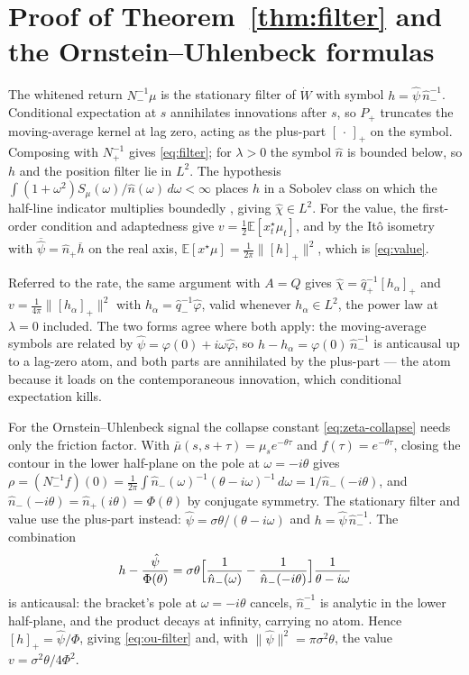 \documentclass[11pt]{article}
\newcommand{\E}{\mathbb{E}}
\newcommand{\pluspart}[1]{\left[#1\right]_+}
\theoremstyle{plain}
\theoremstyle{definition}
\theoremstyle{remark}
\begin{document}
\section{Proof of Theorem~\ref{thm:filter} and the Ornstein--Uhlenbeck formulas}\label{app:B}
The whitened return $N_-^{-1}\mu$ is the stationary filter of $\dot W$ with symbol $h=\hat\psi\,\hat n_-^{-1}$. Conditional expectation at $s$ annihilates innovations after $s$, so $P_+$ truncates the moving-average kernel at lag zero, acting as the plus-part $\pluspart{\,\cdot\,}$ on the symbol. Composing with $N_+^{-1}$ gives \eqref{eq:filter}; for $\lambda>0$ the symbol $\hat n$ is bounded below, so $h$ and the position filter lie in $L^2$. The hypothesis $\int(1+\omega^2)S_\mu(\omega)/\hat n(\omega)\,d\omega<\infty$ places $h$ in a Sobolev class on which the half-line indicator multiplies boundedly \citep[Ch.~1]{LionsMagenes1972}, giving $\hat\chi\in L^2$. For the value, the first-order condition and adaptedness give $v=\tfrac12\E[x^\star_t\mu_t]$, and by the It\^o isometry with $\overline{\hat\psi}=\hat n_+\overline h$ on the real axis, $\E[x^\star\mu]=\tfrac1{2\pi}\|\pluspart{h}\|^2$, which is \eqref{eq:value}.

Referred to the rate, the same argument with $A=Q$ gives $\hat\chi=\hat q_+^{-1}\pluspart{h_\alpha}$ and $v=\frac1{4\pi}\|\pluspart{h_\alpha}\|^2$ with $h_\alpha=\hat q_-^{-1}\hat\varphi$, valid whenever $h_\alpha\in L^2$, the power law at $\lambda=0$ included. The two forms agree where both apply: the moving-average symbols are related by $\hat\psi=\varphi(0)+i\omega\hat\varphi$, so $h-h_\alpha=\varphi(0)\,\hat n_-^{-1}$ is anticausal up to a lag-zero atom, and both parts are annihilated by the plus-part --- the atom because it loads on the contemporaneous innovation, which conditional expectation kills.

For the Ornstein--Uhlenbeck signal the collapse constant \eqref{eq:zeta-collapse} needs only the friction factor. With $\bar\mu(s,s+\tau)=\mu_s e^{-\theta\tau}$ and $f(\tau)=e^{-\theta\tau}$, closing the contour in the lower half-plane on the pole at $\omega=-i\theta$ gives $\rho=(N_-^{-1}f)(0)=\frac{1}{2\pi}\int\hat n_-(\omega)^{-1}(\theta-i\omega)^{-1}\,d\omega=1/\hat n_-(-i\theta)$, and $\hat n_-(-i\theta)=\hat n_+(i\theta)=\Phi(\theta)$ by conjugate symmetry. The stationary filter and value use the plus-part instead: $\hat\psi=\sigma\theta/(\theta-i\omega)$ and $h=\hat\psi\,\hat n_-^{-1}$. The combination
\[
h - \frac{\hat\psi}{\Phi(\theta)} = \sigma\theta\Bigl[\frac{1}{\hat n_-(\omega)} - \frac{1}{\hat n_-(-i\theta)}\Bigr]\frac{1}{\theta-i\omega}
\]
is anticausal: the bracket's pole at $\omega=-i\theta$ cancels, $\hat n_-^{-1}$ is analytic in the lower half-plane, and the product decays at infinity, carrying no atom. Hence $\pluspart{h}=\hat\psi/\Phi$, giving \eqref{eq:ou-filter} and, with $\|\hat\psi\|^2=\pi\sigma^2\theta$, the value $v=\sigma^2\theta/4\Phi^2$.
\end{document}
